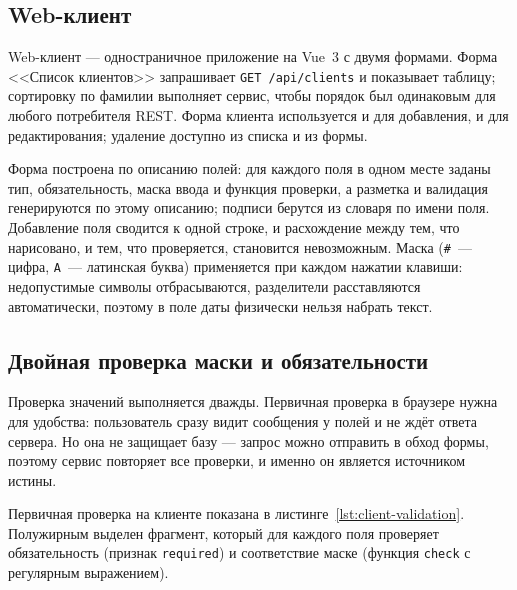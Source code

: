 \documentclass[14pt,a4paper]{extarticle}
\begin{document}
\subsection{Web-клиент}

Web-клиент --- одностраничное приложение на Vue~3 с двумя формами. Форма <<Список
клиентов>> запрашивает \texttt{GET /api/clients} и показывает таблицу; сортировку по фамилии
выполняет сервис, чтобы порядок был одинаковым для любого потребителя REST. Форма клиента
используется и для добавления, и для редактирования; удаление доступно из списка и из формы.

Форма построена по описанию полей: для каждого поля в одном месте заданы тип,
обязательность, маска ввода и функция проверки, а разметка и валидация генерируются по этому
описанию; подписи берутся из словаря по имени поля. Добавление поля сводится к одной строке, и расхождение между тем, что нарисовано,
и тем, что проверяется, становится невозможным. Маска (\texttt{\#}~--- цифра, \texttt{A}~---
латинская буква) применяется при каждом нажатии клавиши: недопустимые символы отбрасываются,
разделители расставляются автоматически, поэтому в поле даты физически нельзя набрать текст.

\subsection{Двойная проверка маски и обязательности}

Проверка значений выполняется дважды. Первичная проверка в браузере нужна для удобства:
пользователь сразу видит сообщения у полей и не ждёт ответа сервера. Но она не защищает
базу --- запрос можно отправить в обход формы, поэтому сервис повторяет все проверки, и
именно он является источником истины.

Первичная проверка на клиенте показана в листинге~\ref{lst:client-validation}. Полужирным
выделен фрагмент, который для каждого поля проверяет обязательность (признак
\texttt{required}) и соответствие маске (функция \texttt{check} с регулярным выражением).
\end{document}
